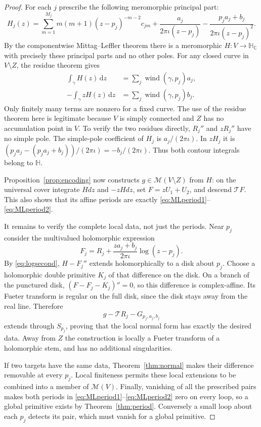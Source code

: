 \documentclass[11pt,a4paper]{article}
\numberwithin{equation}{section}
\theoremstyle{definition}
\theoremstyle{remark}
\newcommand{\C}{\mathbb C}
\newcommand{\HH}{\mathbb H}
\newcommand{\HC}{\mathbb H_{\C}}
\newcommand{\cM}{\mathscr M}
\newcommand{\T}{\mathcal T}
\newcommand{\wind}{\operatorname{wind}}
\newcommand{\dd}{\,\mathrm d}
\begin{document}
\begin{proof}
For each $j$ prescribe the following meromorphic principal part:
\begin{equation}
 H_j(z)=
 \sum_{m=1}^{M_j}m(m+1)(z-p_j)^{-m-2}c_{jm}
 +\frac{a_j}{2\pi\iota(z-p_j)}
 -\frac{p_j a_j+b_j}{2\pi\iota(z-p_j)^2}.
 \label{eq:MLdata}
\end{equation}
By the componentwise Mittag--Leffler theorem there is a meromorphic
$H:V\to\HC$ with precisely these principal parts and no other poles.
For any closed curve in $V\setminus Z$, the residue theorem gives
\begin{align}
 \int_\gamma H(z)\dd z
   &=\sum_j\wind(\gamma,p_j)a_j,\label{eq:MLperiod1}\\
 -\int_\gamma zH(z)\dd z
   &=\sum_j\wind(\gamma,p_j)b_j.
 \label{eq:MLperiod2}
\end{align}
Only finitely many terms are nonzero for a fixed curve. The use of the
residue theorem here is legitimate because $V$ is simply connected and
$Z$ has no accumulation point in $V$.
To verify the two residues directly, $R_j''$ and $zR_j''$ have no simple
pole. The simple-pole coefficient of $H_j$ is $a_j/(2\pi\iota)$.
In $zH_j$ it is
$(p_j a_j-(p_j a_j+b_j))/(2\pi\iota)=-b_j/(2\pi\iota)$.
Thus both contour integrals belong to $\HH$.

Proposition~\ref{prop:encoding} now constructs $g\in\cM(V\setminus Z)$
from $H$: on the universal cover integrate $Hdz$ and $-zHdz$, set
$F=zU_1+U_2$, and descend $\T F$. This also shows that its affine periods
are exactly \eqref{eq:MLperiod1}--\eqref{eq:MLperiod2}.

It remains to verify the complete local data, not just the periods. Near
$p_j$ consider the multivalued holomorphic expression
\[
 F_j=R_j+\frac{za_j+b_j}{2\pi\iota}\log(z-p_j).
\]
By \eqref{eq:logsecond}, $H-F_j''$ extends holomorphically to a disk about
$p_j$. Choose a holomorphic double primitive $K_j$ of that difference on
the disk. On a branch of the punctured disk,
$(F-F_j-K_j)''=0$, so this difference is complex-affine. Its Fueter
transform is regular on the full disk, since the disk stays away from the
real line. Therefore
\[
 g-\T R_j-G_{p_j,a_j,b_j}
\]
extends through $S_{p_j}$, proving that the local normal form has exactly
the desired data. Away from $Z$ the construction is locally a Fueter
transform of a holomorphic stem, and has no additional singularities.

If two targets have the same data, Theorem~\ref{thm:normal} makes their
difference removable at every $p_j$. Local finiteness permits these local
extensions to be combined into a member of $\cM(V)$. Finally, vanishing
of all the prescribed pairs makes both periods in
\eqref{eq:MLperiod1}--\eqref{eq:MLperiod2} zero on every loop, so a global
primitive exists by Theorem~\ref{thm:period}. Conversely a small loop
about each $p_j$ detects its pair, which must vanish for a global primitive.
\end{proof}
\end{document}
